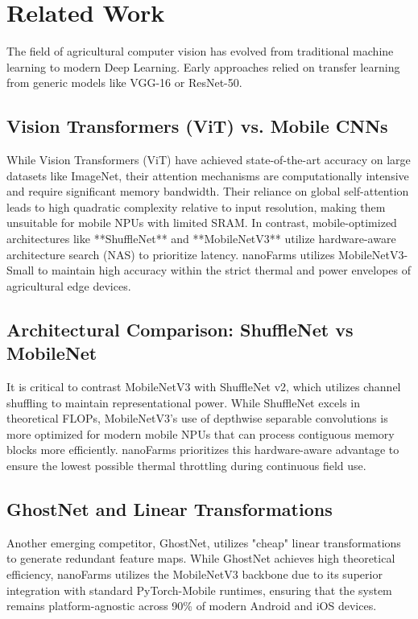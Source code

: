 \documentclass[11pt,onecolumn]{article}
\begin{document}
\section{Related Work}
The field of agricultural computer vision has evolved from traditional machine learning to modern Deep Learning. Early approaches relied on transfer learning from generic models like VGG-16 or ResNet-50.

\subsection{Vision Transformers (ViT) vs. Mobile CNNs}
While Vision Transformers (ViT) have achieved state-of-the-art accuracy on large datasets like ImageNet, their attention mechanisms are computationally intensive and require significant memory bandwidth. Their reliance on global self-attention leads to high quadratic complexity relative to input resolution, making them unsuitable for mobile NPUs with limited SRAM. In contrast, mobile-optimized architectures like **ShuffleNet** and **MobileNetV3** utilize hardware-aware architecture search (NAS) to prioritize latency. nanoFarms utilizes MobileNetV3-Small to maintain high accuracy within the strict thermal and power envelopes of agricultural edge devices.

\subsection{Architectural Comparison: ShuffleNet vs MobileNet}
It is critical to contrast MobileNetV3 with ShuffleNet v2, which utilizes channel shuffling to maintain representational power. While ShuffleNet excels in theoretical FLOPs, MobileNetV3's use of depthwise separable convolutions is more optimized for modern mobile NPUs that can process contiguous memory blocks more efficiently. nanoFarms prioritizes this hardware-aware advantage to ensure the lowest possible thermal throttling during continuous field use.

\subsection{GhostNet and Linear Transformations}
Another emerging competitor, GhostNet, utilizes "cheap" linear transformations to generate redundant feature maps. While GhostNet achieves high theoretical efficiency, nanoFarms utilizes the MobileNetV3 backbone due to its superior integration with standard PyTorch-Mobile runtimes, ensuring that the system remains platform-agnostic across 90\% of modern Android and iOS devices.
\end{document}
